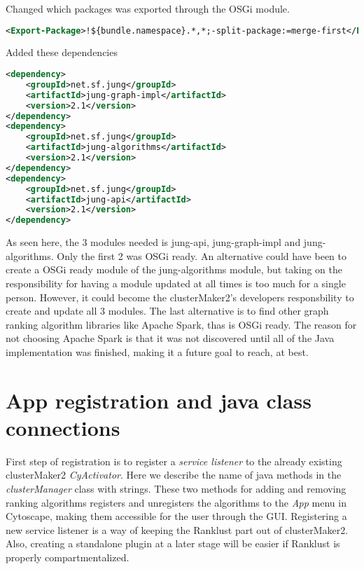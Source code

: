 Changed which packages was exported through the OSGi module.

\begin{lstlisting}[language=XML, caption={POM-file OSGi changes}]
<Export-Package>!${bundle.namespace}.*,*;-split-package:=merge-first</Export-Package>
\end{lstlisting}

Added these dependencies

\begin{lstlisting}[language=XML, caption={POM-file JUNG changes}]
<dependency>
    <groupId>net.sf.jung</groupId>
    <artifactId>jung-graph-impl</artifactId>
    <version>2.1</version>
</dependency>
<dependency>
    <groupId>net.sf.jung</groupId>
    <artifactId>jung-algorithms</artifactId>
    <version>2.1</version>
</dependency>
<dependency>
    <groupId>net.sf.jung</groupId>
    <artifactId>jung-api</artifactId>
    <version>2.1</version>
</dependency>
\end{lstlisting}

As seen here, the 3 modules needed is jung-api, jung-graph-impl and
jung-algorithms. Only the first 2 was OSGi ready. An alternative could have been
to create a OSGi ready module of the jung-algorithms module, but taking on the
responsibility for having a module updated at all times is too much for a single
person. However, it could become the clusterMaker2's developers responsbility to
create and update all 3 modules. The last alternative is to find other graph
ranking algorithm libraries like Apache Spark\cite{spark}, thas is OSGi ready.
The reason for not choosing Apache Spark is that it was not discovered until all
of the Java implementation was finished, making it a future goal to reach, at
best.

\section{App registration and java class connections}
First step of registration is to register a \textit{service listener} to the
already existing clusterMaker2 \textit{CyActivator}. Here we describe the name
of java methods in the \textit{clusterManager} class with strings. These two
methods for adding and removing ranking algorithms registers and unregisters the
algorithms to the \textit{App} menu in Cytoscape, making them accessible for the
user through the GUI. Registering a new service listener is a way of keeping the
Ranklust part out of clusterMaker2. Also, creating a standalone plugin at
a later stage will be easier if Ranklust is properly compartmentalized.

